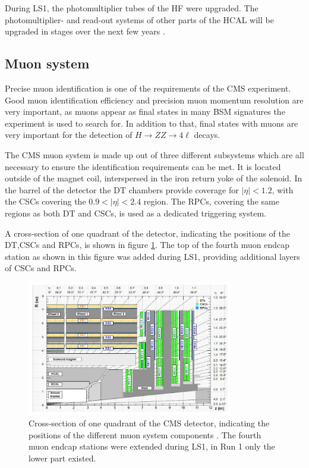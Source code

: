 During \ac{LS1}, the photomultiplier tubes of the \ac{HF} were upgraded. The photomultiplier- and
read-out systems of other parts of the \ac{HCAL} will be upgraded in stages over the
next few years \cite{cms-hcal-upgrade}.


\subsection{Muon system}
\label{sec:CMSLHC_CMS_muons}
Precise muon identification is one of the requirements of the \ac{CMS} 
experiment. Good muon identification efficiency and precision muon momentum 
resolution are very important, as muons appear as final states in many
\ac{BSM} signatures the experiment is used to search for. In addition to
that, final states with muons are very important for the detection of $H\rightarrow ZZ \rightarrow 4\ell$ decays.

The \ac{CMS} muon system \cite{cms-jinst} is made up out of three different subsystems which
are all necessary to ensure the identification requirements can be met. It is located
outside of the magnet coil, interspersed in the iron return yoke of the solenoid.
In the barrel of the detector the \ac{DT} chambers provide coverage for $|\eta|<1.2$, with
the \ac{CSCs} covering the $0.9<|\eta|<2.4$ region. The \ac{RPCs}, covering the same
regions as both \ac{DT} and \ac{CSCs}, is used as a dedicated triggering system.

A cross-section of one quadrant of the detector, indicating
the positions of the \ac{DT},\ac{CSCs} and \ac{RPCs}, is shown in figure \ref{fig:CMS_MuonSystem}.
The top of the fourth muon endcap station as shown in this figure was added during \ac{LS1}, providing
additional layers of \ac{CSCs} and \ac{RPCs}.
\begin{figure}[h!]
\begin{center}
\includegraphics[width=0.8\textwidth]{./Detector/Plots/MuonSystemUpgrade.png}
\caption{Cross-section of one quadrant of the CMS detector, indicating
the positions of the different muon system components \cite{cms-muon-upgrade}. The 
fourth muon endcap stations were extended during \ac{LS1}, in Run 1 only the lower
part existed.}
\label{fig:CMS_MuonSystem}
\end{center}
\end{figure}

